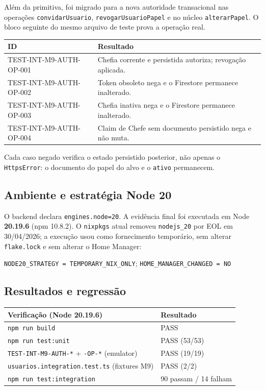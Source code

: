 Além da primitiva,  foi migrado para a nova
autoridade transacional nas operações \texttt{convidarUsuario},
\texttt{revogarUsuarioPapel} e no núcleo \texttt{alterarPapel}. O bloco seguinte
do mesmo arquivo de teste prova a operação real.

\small
\begin{longtable}{@{}p{}p{}@{}}
\toprule
ID & Resultado \\
\midrule
\endhead
TEST-INT-M9-AUTH-OP-001 & Chefia corrente e persistida autoriza; revogação aplicada. \\
TEST-INT-M9-AUTH-OP-002 & Token obsoleto nega e o Firestore permanece inalterado. \\
TEST-INT-M9-AUTH-OP-003 & Chefia inativa nega e o Firestore permanece inalterado. \\
TEST-INT-M9-AUTH-OP-004 & Claim de Chefe sem documento persistido nega e não muta. \\
\bottomrule
\end{longtable}
\normalsize

Cada caso negado verifica o estado persistido posterior, não apenas o
\texttt{HttpsError}: o documento do papel do alvo e o \texttt{ativo} permanecem.

\subsection{Ambiente e estratégia Node 20}

O backend declara \texttt{engines.node=20}. A evidência final foi executada em
Node \textbf{20.19.6} (npm 10.8.2). O \texttt{nixpkgs} atual removeu
\texttt{nodejs\_20} por EOL em 30/04/2026; a execução usou
 como fornecimento
temporário, sem alterar \texttt{flake.lock} e sem alterar o Home Manager:

\begin{center}
\texttt{NODE20\_STRATEGY = TEMPORARY\_NIX\_ONLY}; \quad
\texttt{HOME\_MANAGER\_CHANGED = NO}
\end{center}

\subsection{Resultados e regressão}

\small
\begin{longtable}{@{}p{}p{}@{}}
\toprule
Verificação (Node 20.19.6) & Resultado \\
\midrule
\endhead
\texttt{npm run build} & PASS \\
\texttt{npm run test:unit} & PASS (53/53) \\
\texttt{TEST-INT-M9-AUTH-*} + \texttt{-OP-*} (emulator) & PASS (19/19) \\
\texttt{usuarios.integration.test.ts} (fixtures M9) & PASS (2/2) \\
\texttt{npm run test:integration} & 90 passam / 14 falham \\
\bottomrule
\end{longtable}
\normalsize

